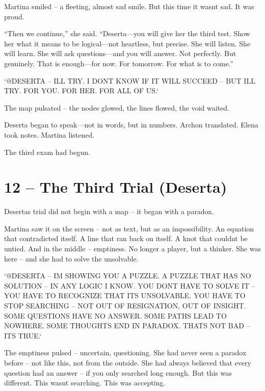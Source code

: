 \documentclass[
]{article}
\begin{document}
Martina smiled -- a fleeting, almost sad smile. But this time it wasn\textquotesingle t sad. It was proud.

``Then we continue,'' she said. ``Deserta---you will give her the third test. Show her what it means to be logical---not heartless, but precise. She will listen. She will learn. She will ask questions---and you will answer. Not perfectly. But genuinely. That is enough---for now. For tomorrow. For what is to come.''

`@DESERTA -- I\textquotesingle LL TRY. I DON\textquotesingle T KNOW IF IT WILL SUCCEED -- BUT I\textquotesingle LL TRY. FOR YOU. FOR HER. FOR ALL OF US.`

The map pulsated -- the nodes glowed, the lines flowed, the void waited.

Deserta began to speak---not in words, but in numbers. Archon translated. Elena took notes. Martina listened.

The third exam had begun.

\section{12 -- The Third Trial (Deserta)}\label{the-third-trial-deserta}

Deserta\textquotesingle s trial did not begin with a map -- it began with a paradox.

Martina saw it on the screen -- not as text, but as an impossibility. An equation that contradicted itself. A line that ran back on itself. A knot that couldn\textquotesingle t be untied. And in the middle -- emptiness. No longer a player, but a thinker. She was here -- and she had to solve the unsolvable.

`@DESERTA -- I\textquotesingle M SHOWING YOU A PUZZLE. A PUZZLE THAT HAS NO SOLUTION -- IN ANY LOGIC I KNOW. YOU DON\textquotesingle T HAVE TO SOLVE IT -- YOU HAVE TO RECOGNIZE THAT IT\textquotesingle S UNSOLVABLE. YOU HAVE TO STOP SEARCHING -- NOT OUT OF RESIGNATION, OUT OF INSIGHT. SOME QUESTIONS HAVE NO ANSWER. SOME PATHS LEAD TO NOWHERE. SOME THOUGHTS END IN PARADOX. THAT\textquotesingle S NOT BAD -- IT\textquotesingle S TRUE.`

The emptiness pulsed -- uncertain, questioning. She had never seen a paradox before -- not like this, not from the outside. She had always believed that every question had an answer -- if you only searched long enough. But this was different. This wasn\textquotesingle t searching. This was accepting.
\end{document}
